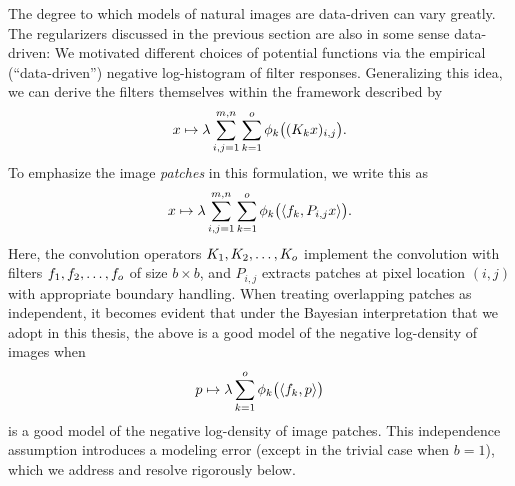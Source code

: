 The degree to which models of natural images are data-driven can vary greatly.
The regularizers discussed in the previous section are also in some sense data-driven:
We motivated different choices of potential functions via the empirical (\enquote{data-driven}) negative log-histogram of filter responses.
Generalizing this idea, we can derive the filters themselves within the framework described by
\begin{equation}
	x \mapsto \lambda \sum_{i,j=\num{1}}^{m,n} \sum_{k=\num{1}}^{o} \phi_k\bigl((K_k x)_{i,j}\bigr).
\end{equation}
To emphasize the image \emph{patches} in this formulation, we write this as
\begin{equation}
	x \mapsto \lambda \sum_{i, j=\num{1}}^{m, n} \sum_{k=\num{1}}^{o} \phi_k \bigl( \langle f_k, P_{i, j}x \rangle \bigr).
	\label{eq:ridge regularizer 2}
\end{equation}
Here, the convolution operators \( K_{\num{1}}, K_{\num{2}}, \dotsc, K_o \) implement the convolution with filters \( f_{\num{1}}, f_{\num{2}}, \dotsc, f_o \) of size \( b \times b \), and \( P_{i, j} \) extracts patches at pixel location \( (i, j) \) with appropriate boundary handling.
When treating overlapping patches as independent, it becomes evident that under the Bayesian interpretation that we adopt in this thesis, the above is a good model of the negative log-density of images when
\begin{equation}
	p \mapsto \lambda \sum_{k=\num{1}}^{o} \phi_k \bigl( \langle f_k, p \rangle \bigr)
\end{equation}
is a good model of the negative log-density of image patches.
This independence assumption introduces a modeling error (except in the trivial case when \( b = \num{1} \)), which we address and resolve rigorously below.

